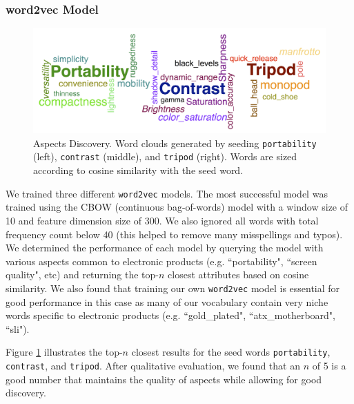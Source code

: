 \documentclass{article} %
\begin{document}
\subsubsection{word2vec Model}
\begin{figure}[ht]
\begin{center}
\includegraphics[width=\columnwidth]{Aspects_long.png}
\end{center}
\caption{Aspects Discovery. Word clouds generated by seeding \texttt{portability} (left), \texttt{contrast} (middle), and \texttt{tripod} (right). Words are sized according to cosine similarity with the seed word.}
\label{aspectFig}
\end{figure}

We trained three different \texttt{word2vec} models. The most successful model was trained using the CBOW (continuous bag-of-words) model with a window size of 10 and feature dimension size of 300. We also ignored all words with total frequency count below 40 (this helped to remove many misspellings and typos). We determined the performance of each model by querying the model with various aspects common to electronic products (e.g. ``portability", ``screen quality", etc) and returning the top-$n$ closest attributes based on cosine similarity. We also found that training our own \texttt{word2vec} model is essential for good performance in this case as many of our vocabulary contain very niche words specific to electronic products (e.g. ``gold\_plated", ``atx\_motherboard", ``sli").

Figure \ref{aspectFig} illustrates the top-$n$ closest results for the seed words \texttt{portability}, \texttt{contrast}, and \texttt{tripod}. After qualitative evaluation, we found that an $n$ of 5 is a good number that maintains the quality of aspects while allowing for good discovery.
\end{document}
